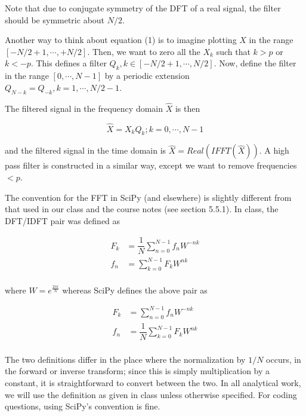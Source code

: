 \documentclass[11pt]{article}
\begin{document}
Note that due to conjugate symmetry of the DFT of a real signal, the filter should be symmetric about $N/2$.

Another way to think about equation (1) is to imagine plotting $X$ in the range $[-N/2 + 1,\cdots, +N/2]$. Then, we want to zero all the $X_k$ such that $k > p$ or $k < -p$. This defines a filter $Q_k, k \in [-N/2 + 1, \cdots, N/2]$. Now, define the filter in the range $[0, \cdots, N - 1]$ by a periodic extension $Q_{N-k} = Q_{-k}, k = 1,\cdots,N/2-1$.

The filtered signal in the frequency domain $\hat{X}$ is then

\[ \hat{X} = X_k Q_k ; k = 0, \cdots, N - 1 \]

and the filtered signal in the time domain is $\hat{X} = Real(IFFT(\hat{X}))$. A high pass filter is constructed in a similar way, except we want to remove frequencies $< p$.

The convention for the FFT in SciPy (and elsewhere) is slightly different from that used in our class and the course notes (see section 5.5.1). In class, the DFT/IDFT pair was defined as

\begin{align*}
  F_k &= \dfrac{1}{N} \sum_{n = 0}^{N - 1} f_n W^{-nk} \\
  f_n &= \sum_{k = 0}^{N - 1} F_k W^{nk} \\
\end{align*}

where $W = e^\frac{2 \pi i}{N}$ whereas SciPy defines the above pair as

\begin{align*}
  F_k &=  \sum_{n = 0}^{N - 1} f_n W^{-nk} \\
  f_n &= \dfrac{1}{N} \sum_{k = 0}^{N - 1} F_k W^{nk} \\
\end{align*}

The two definitions differ in the place where the normalization by $1/N$ occurs, in the forward or inverse transform; since this is simply multiplication by a constant, it is straightforward to convert between the two. In all analytical work, we will use the definition as given in class unless otherwise specified. For coding questions, using SciPy's convention is fine.
\end{document}
